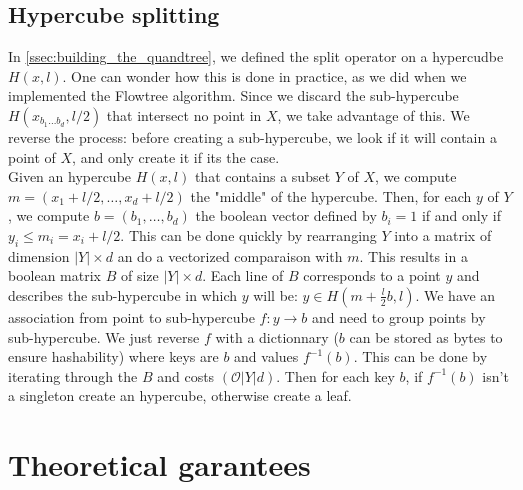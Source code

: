 \documentclass{article}
\begin{document}
\subsection{Hypercube splitting}
In \ref{ssec:building_the_quandtree}, we defined the split operator on a hypercudbe $H(x, l)$. One can wonder how this is done in practice, as we did when we implemented the Flowtree algorithm. Since we discard the sub-hypercube $H(x_{b_1 \dots b_d}, l/2)$ that intersect no point in $X$, we take advantage of this. We reverse the process: before creating a sub-hypercube, we look if it will contain a point of $X$, and only create it if its the case.\\
Given an hypercube $H(x, l)$ that contains a subset $Y$ of $X$, we compute $m = (x_1+l/2, \dots, x_d+l/2)$ the "middle" of the hypercube. Then, for each $y$ of $Y$, we compute $b = (b_1, \dots, b_d)$ the boolean vector defined by $b_i = 1$ if and only if $y_i \leq m_i = x_i + l/2$. This can be done quickly by rearranging $Y$ into a matrix of dimension $\vert Y \vert \times d$ an do a vectorized comparaison with $m$. 
This results in a boolean matrix $B$ of size $\vert Y \vert \times d$. Each line of $B$ corresponds to a point $y$ and describes the sub-hypercube in which $y$ will be: $y \in H(m + \frac{l}{2}b, l)$.
We have an association from point to sub-hypercube $f: y \rightarrow b$ and need to group points by sub-hypercube. We just reverse $f$ with a dictionnary ($b$ can be stored as bytes to ensure hashability) where keys are $b$ and values $f^{-1}(b)$. This can be done by iterating through the $B$ and costs $(\mathcal{O}\vert Y \vert d)$. Then for each key $b$, if $f^{-1}(b)$ isn't a singleton create an hypercube, otherwise create a leaf.\\

\section{Theoretical garantees}
\end{document}
